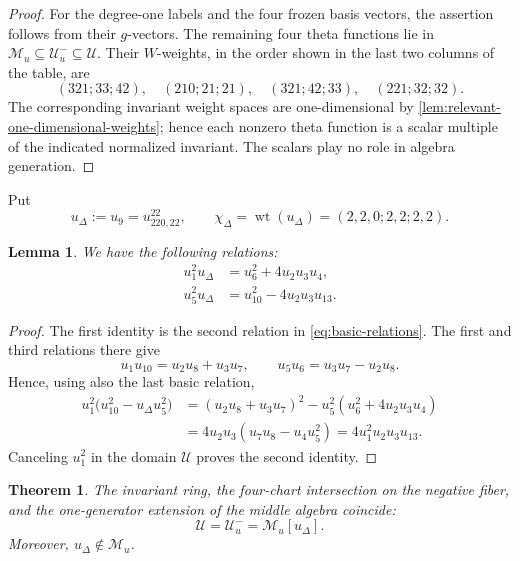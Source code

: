 \documentclass[11pt,reqno]{amsart}
\numberwithin{equation}{section}
\newtheorem{theorem}{Theorem}[section]
\newtheorem{lemma}[lemma]{Lemma}
\theoremstyle{remark}
\newcommand{\UR}{\mathscr U}
\newcommand{\Uneg}{\mathcal U_u^{-}}
\newcommand{\Mu}{\mathcal M_u}
\newcommand{\udisc}{u_{\Delta}}
\newcommand{\wt}{\operatorname{wt}}
\begin{document}
\begin{proof}
For the degree-one labels and the four frozen basis vectors, the assertion
follows from their $g$-vectors.  The remaining four theta functions lie in
$\Mu\subseteq\Uneg\subseteq\UR$.  Their $W$-weights, in the order shown in
the last two columns of the table, are
\[ (321;33;42),\quad(210;21;21),\quad (321;42;33),\quad(221;32;32). \]
The corresponding invariant weight spaces are one-dimensional by
\cref{lem:relevant-one-dimensional-weights}; hence each nonzero theta function
is a scalar multiple of the indicated normalized invariant.  The scalars play
no role in algebra generation.
\end{proof}

Put
\[ \udisc:=u_9=u_{220,22}^{22}, \qquad \chi_\Delta=\wt(\udisc)=(2,2,0;2,2;2,2). \]

\begin{lemma}\label{lem:discriminant-chart-identities}
We have the following relations:
\begin{equation}
\label{eq:discriminant-chart-identities}
 \begin{aligned}
 u_1^2\udisc&=u_6^2+4u_2u_3u_4,\\
 u_5^2\udisc&=u_{10}^2-4u_2u_3u_{13}.
 \end{aligned}
\end{equation}
\end{lemma}

\begin{proof}
The first identity is the second relation in
\eqref{eq:basic-relations}.  The first and third relations there give
\[ u_1u_{10}=u_2u_8+u_3u_7, \qquad u_5u_6=u_3u_7-u_2u_8. \]
Hence, using also the last basic relation,
\[
 \begin{aligned}
 u_1^2\bigl(u_{10}^2-\udisc u_5^2\bigr)
 &=(u_2u_8+u_3u_7)^2-u_5^2(u_6^2+4u_2u_3u_4)\\
 &=4u_2u_3(u_7u_8-u_4u_5^2)
  =4u_1^2u_2u_3u_{13}.
 \end{aligned}
\]
Canceling $u_1^2$ in the domain $\UR$ proves the second identity.
\end{proof}

\begin{theorem}
\label{thm:middle-plus-discriminant}
The invariant ring, the four-chart intersection on the negative fiber, and
the one-generator extension of the middle algebra coincide:
\begin{equation}
\label{eq:upper-middle-extension}
 \UR=\Uneg=\Mu[\udisc].
\end{equation}
Moreover, $\udisc\notin\Mu$.
\end{theorem}
\end{document}
